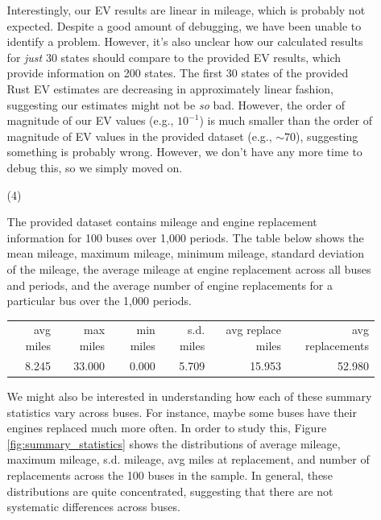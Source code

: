 \documentclass[paper=a4, fontsize=11pt]{scrartcl} %
\numberwithin{equation}{section} %
\numberwithin{figure}{section} %
\numberwithin{table}{section} %
\begin{document}
\begin{itemize}
\begin{itemize}
Interestingly, our EV results are linear in mileage, which is probably not expected. Despite a good amount of debugging, we have been unable to identify a problem. However, it's also unclear how our calculated results for \textit{just} 30 states should compare to the provided EV results, which provide information on 200 states. The first 30 states of the provided Rust EV estimates are decreasing in approximately linear fashion, suggesting our estimates might not be \textit{so} bad. However, the order of magnitude of our EV values (e.g., $10^{-1}$) is much smaller than the order of magnitude of EV values in the provided dataset (e.g., $\sim 70$), suggesting something is probably wrong. However, we don't have any more time to debug this, so we simply moved on.

\item[(4)]

The provided dataset contains mileage and engine replacement information for 100 buses over 1,000 periods. The table below shows the mean mileage, maximum mileage, minimum mileage, standard deviation of the mileage, the average mileage at engine replacement across all buses and periods, and the average number of engine replacements for a particular bus over the 1,000 periods.

\begin{center}
\begin{tabular}{r | r | r | r | r | r}
\hline
avg miles & max miles & min miles & s.d. miles & avg replace miles & avg replacements\\ 
8.245 & 33.000 & 0.000 & 5.709 & 15.953 & 52.980 \\
\hline
\end{tabular}
\end{center}

We might also be interested in understanding how each of these summary statistics vary across buses. For instance, maybe some buses have their engines replaced much more often. In order to study this, Figure \ref{fig:summary_statistics} shows the distributions of average mileage, maximum mileage, s.d. mileage, avg miles at replacement, and number of replacements across the 100 buses in the sample. In general, these distributions are quite concentrated, suggesting that there are not systematic differences across buses.


\end{itemize}
\end{itemize}
\end{document}
